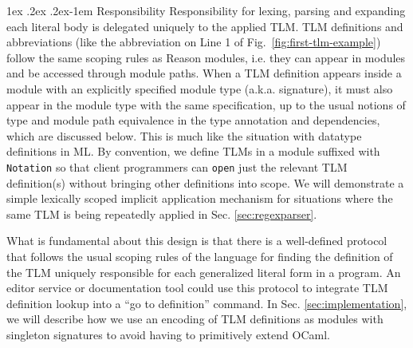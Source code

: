 \documentclass[acmsmall,screen]{acmart}
\makeatletter
\renewcommand{\subsubsection}{%
  \@startsection{subsubsection}{3}%
  {\z@}{1ex \@plus .2ex \@minus .2ex}{-1em}%
  {\sffamily\normalsize\itshape\maybe@addperiod}%
}
\newcommand{\maybe@addperiod}[1]{%
  #1\@addpunct{.}%
}
\newcommand{\li}[1]{\lstinline[basicstyle=\ttfamily\fontsize{9pt}{1em}\selectfont]{#1}}
\makeatother
\begin{document}

\subsubsection{Responsibility} 
Responsibility for lexing, parsing and expanding each literal body is delegated uniquely to the applied TLM. %
TLM definitions and abbreviations (like the abbreviation on Line 1 of Fig.~\ref{fig:first-tlm-example}) follow the same scoping rules as Reason modules, i.e. they can appear in modules and be accessed through module paths. When a TLM definition appears inside a module with an explicitly specified module type (a.k.a. signature), it must also appear in the module type with the same specification, up to the usual notions of type and module path equivalence in the type annotation and dependencies, which are discussed below. This is much like the situation with datatype definitions in ML. By convention, we define TLMs in a module suffixed with \li{Notation} so that client programmers can \li{open} just the relevant TLM definition(s) without bringing other definitions into scope. We will demonstrate a simple lexically scoped implicit application mechanism for situations where the same TLM is being repeatedly applied  in Sec. \ref{sec:regexparser}.

What is fundamental about this design is that there is a well-defined protocol that follows the usual scoping rules of the language for finding the definition of the TLM uniquely responsible for each generalized literal form in a program. An editor service or documentation tool could use this protocol to integrate TLM definition lookup into a ``go to definition'' command. In Sec. \ref{sec:implementation}, we will describe how we use an encoding of TLM definitions as modules with singleton signatures to avoid having to primitively extend OCaml.
\end{document}
